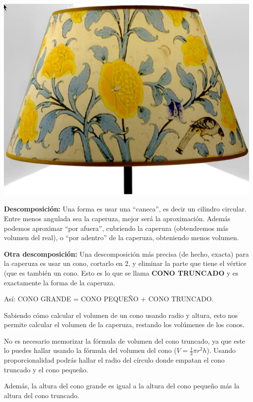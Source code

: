\documentclass[12pt,a4paper]{article}
\begin{document}
\begin{multicols}{2}
\begin{center}
\includegraphics[width=0.75\columnwidth]{Figuras/fig22.png}
\end{center}

\textbf{Descomposición:} Una forma es usar una ``caneca'', es decir un cilindro circular. Entre menos angulada sea la caperuza, mejor será la aproximación. Además podemos aproximar ``por afuera'', cubriendo la caperuza (obtendremos más volumen del real), o ``por adentro'' de la caperuza, obteniendo menos volumen.

\textbf{Otra descomposición:} Una descomposición más precisa (de hecho, exacta) para la caperuza es usar un cono, cortarlo en 2, y eliminar la parte que tiene el vértice (que es también un cono. Esto es lo que se llama \textbf{CONO TRUNCADO} y es exactamente la forma de la caperuza.

Así: CONO GRANDE = CONO PEQUEÑO + CONO TRUNCADO.

Sabiendo cómo calcular el volumen de un cono usando radio y altura, esto nos permite calcular el volumen de la caperuza, restando los volúmenes de los conos.

\begin{tcolorbox}[colback=fondorosa, colframe=rojoclaro, breakable]
No es necesario memorizar la fórmula de volumen del cono truncado, ya que este lo puedes hallar usando la fórmula del volumen del cono ($V = \frac{1}{3}\pi r^2 h$). Usando proporcionalidad podrás hallar el radio del círculo donde empatan el cono truncado y el cono pequeño.
\end{tcolorbox}

Además, la altura del cono grande es igual a la altura del cono pequeño más la altura del cono truncado.



\end{multicols}
\end{document}
